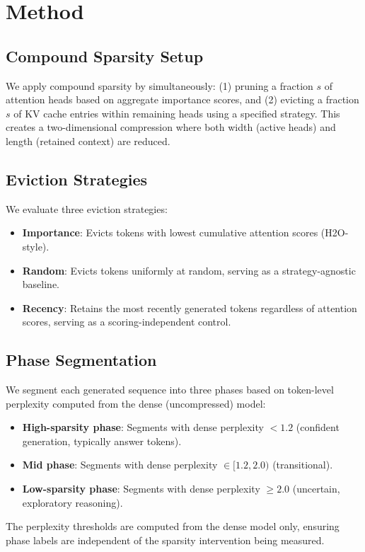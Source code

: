 \documentclass[11pt,a4paper]{article}
\begin{document}
\section{Method}

\subsection{Compound Sparsity Setup}

We apply compound sparsity by simultaneously: (1) pruning a fraction $s$ of attention heads based on aggregate importance scores, and (2) evicting a fraction $s$ of KV cache entries within remaining heads using a specified strategy. This creates a two-dimensional compression where both width (active heads) and length (retained context) are reduced.

\subsection{Eviction Strategies}

We evaluate three eviction strategies:
\begin{itemize}
    \item \textbf{Importance}: Evicts tokens with lowest cumulative attention scores (H2O-style).
    \item \textbf{Random}: Evicts tokens uniformly at random, serving as a strategy-agnostic baseline.
    \item \textbf{Recency}: Retains the most recently generated tokens regardless of attention scores, serving as a scoring-independent control.
\end{itemize}

\subsection{Phase Segmentation}

We segment each generated sequence into three phases based on token-level perplexity computed from the dense (uncompressed) model:
\begin{itemize}
    \item \textbf{High-sparsity phase}: Segments with dense perplexity $< 1.2$ (confident generation, typically answer tokens).
    \item \textbf{Mid phase}: Segments with dense perplexity $\in [1.2, 2.0)$ (transitional).
    \item \textbf{Low-sparsity phase}: Segments with dense perplexity $\geq 2.0$ (uncertain, exploratory reasoning).
\end{itemize}
The perplexity thresholds are computed from the dense model only, ensuring phase labels are independent of the sparsity intervention being measured.
\end{document}
